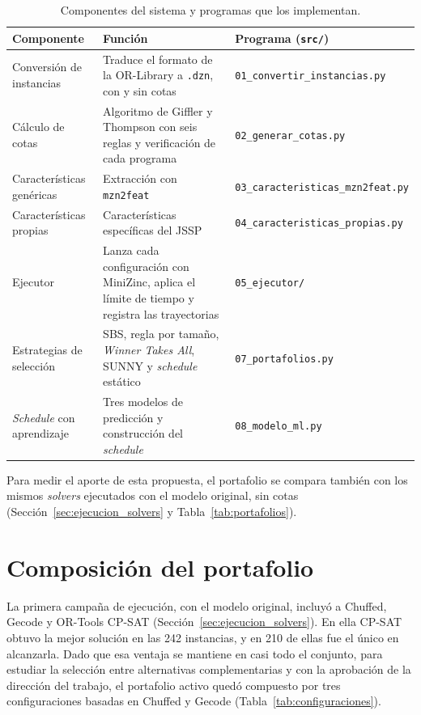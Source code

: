 \begin{table}[H]
  \centering
  \small
  \singlespacing
  \caption{Componentes del sistema y programas que los implementan.}
  \label{tab:componentes}
  \begin{tabularx}{\textwidth}{>{\raggedright\arraybackslash}p{3.4cm} >{\raggedright\arraybackslash}X l}
    \toprule
    \textbf{Componente} & \textbf{Función} & \textbf{Programa (\texttt{src/})} \\
    \midrule
    Conversión de instancias & Traduce el formato de la OR-Library a
      \texttt{.dzn}, con y sin cotas & \texttt{01\_convertir\_instancias.py} \\
    Cálculo de cotas & Algoritmo de Giffler y Thompson con seis reglas y
      verificación de cada programa & \texttt{02\_generar\_cotas.py} \\
    Características genéricas & Extracción con \texttt{mzn2feat} &
      \texttt{03\_caracteristicas\_mzn2feat.py} \\
    Características propias & Características específicas del JSSP &
      \texttt{04\_caracteristicas\_propias.py} \\
    Ejecutor & Lanza cada configuración con MiniZinc, aplica el límite de
      tiempo y registra las trayectorias & \texttt{05\_ejecutor/} \\
    Estrategias de selección & SBS, regla por tamaño, \textit{Winner Takes
      All}, SUNNY y \textit{schedule} estático & \texttt{07\_portafolios.py} \\
    \textit{Schedule} con aprendizaje & Tres modelos de predicción y
      construcción del \textit{schedule} & \texttt{08\_modelo\_ml.py} \\
    \bottomrule
  \end{tabularx}
\end{table}

Para medir el aporte de esta propuesta, el portafolio se compara también con
los mismos \textit{solvers} ejecutados con el modelo original, sin cotas
(Sección~\ref{sec:ejecucion_solvers} y Tabla~\ref{tab:portafolios}).

\section{Composición del portafolio}
\label{sec:composicion}

La primera campaña de ejecución, con el modelo original, incluyó a Chuffed,
Gecode y OR-Tools CP-SAT (Sección~\ref{sec:ejecucion_solvers}). En ella CP-SAT
obtuvo la mejor solución en las 242 instancias, y en 210 de ellas fue el único
en alcanzarla. Dado que esa ventaja se mantiene en casi todo el conjunto, para
estudiar la selección entre alternativas complementarias y con la aprobación de
la dirección del trabajo, el portafolio activo quedó compuesto por tres
configuraciones basadas en Chuffed y Gecode (Tabla~\ref{tab:configuraciones}).

